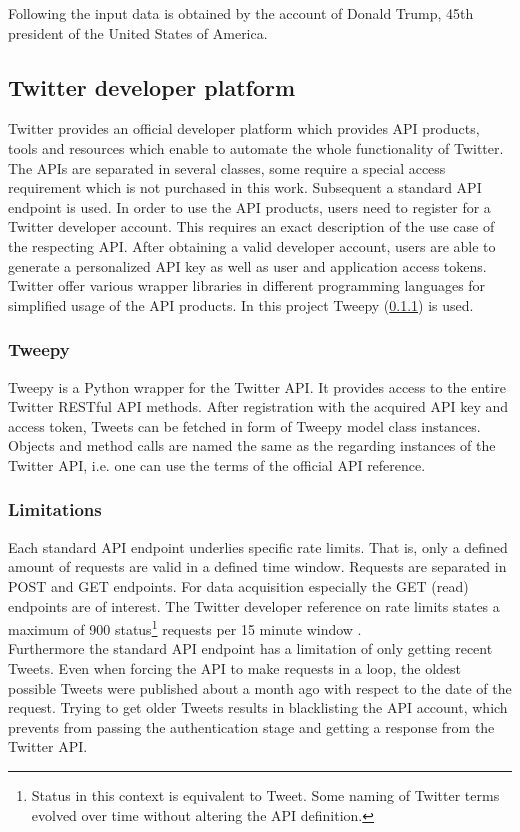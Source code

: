 \documentclass[hidelinks, conference]{IEEEtran}
\begin{document}
Following the input data is obtained by the account of Donald Trump, 45th president of the United States of America.

\subsection{Twitter developer platform}\label{subsec_twitter}

Twitter provides an official developer platform which provides API products, tools and resources which enable to automate the whole functionality of Twitter. The APIs are separated in several classes, some require a special access requirement which is not purchased in this work. Subsequent a standard API endpoint is used. In order to use the API products, users need to register for a Twitter developer account. This requires an exact description of the use case of the respecting API. After obtaining a valid developer account, users are able to generate a personalized API key as well as user and application access tokens. Twitter offer various wrapper libraries in different programming languages for simplified usage of the API products. In this project Tweepy (\ref{subsubsec_tweepy}) is used. \cite{tweepy}

\subsubsection{Tweepy}\label{subsubsec_tweepy}

Tweepy is a Python wrapper for the Twitter API. It provides access to the entire Twitter RESTful API methods. After registration with the acquired API key and access token, Tweets can be fetched in form of Tweepy model class instances. Objects and method calls are named the same as the regarding instances of the Twitter API, i.e. one can use the terms of the official API reference.

\subsubsection{Limitations}

Each standard API endpoint underlies specific rate limits. That is, only a defined amount of requests are valid in a defined time window. Requests are separated in POST and GET endpoints. For data acquisition especially the GET (read) endpoints are of interest. The Twitter developer reference on rate limits states a maximum of 900 status\footnote{Status in this context is equivalent to Tweet. Some naming of Twitter terms evolved over time without altering the API definition.} requests per 15 minute window \cite{twidev_rates}.\\
Furthermore the standard API endpoint has a limitation of only getting recent Tweets. Even when forcing the API to make requests in a loop, the oldest possible Tweets were published about a month ago with respect to the date of the request. Trying to get older Tweets results in blacklisting the API account, which prevents from passing the authentication stage and getting a response from the Twitter API. 
\end{document}
